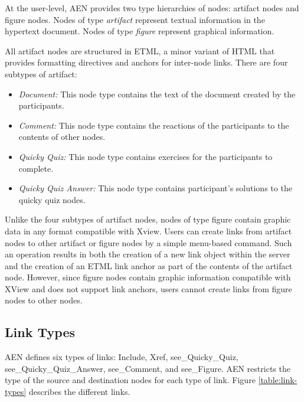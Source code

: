 At the user-level, AEN provides two type hierarchies of nodes: artifact
nodes and figure nodes.  Nodes of type {\em artifact} represent textual
information in the hypertext document.  Nodes of type {\em figure}
represent graphical information.

All artifact nodes are structured in ETML, a minor variant of HTML that provides formatting directives and
anchors for inter-node links. There are four subtypes of artifact:

\begin{itemize}
\item{\em Document:} This node type contains the text of the document created by
the participants.
\item{\em Comment:} This node type contains the reactions of the participants to
the contents of other nodes.
\item{\em Quicky Quiz:} This node type contains exercises for the participants
to complete.
\item{\em Quicky Quiz Answer:} This node type contains participant's
solutions to the quicky quiz nodes.
\end{itemize}



Unlike the four subtypes of artifact nodes, nodes of type figure
contain graphic data in any format compatible with Xview.  Users can create
links from artifact nodes to other artifact or figure nodes by a
simple menu-based command.  Such an operation results in both the
creation of a new link object within the server and the creation of an
ETML link anchor as part of the contents of the artifact node.
However, since figure nodes contain graphic information compatible with XView
and does not support link anchors, users cannot create links from
figure nodes to other nodes.


\subsection{Link Types}

AEN defines six types of links: Include, Xref,
see\_Quicky\_Quiz, see\_Quicky\_Quiz\_Answer, see\_Comment, and
see\_Figure.  AEN restricts the type of the source and destination nodes
for each type of link. Figure \ref{table:link-types} describes the different
links.  

